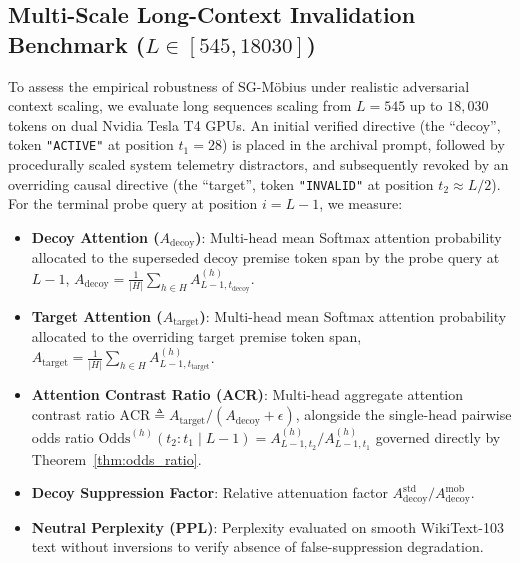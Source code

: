 \documentclass[11pt,a4paper]{article}
\theoremstyle{definition}
\begin{document}
\subsection{Multi-Scale Long-Context Invalidation Benchmark ($L \in [545, 18030]$)}
To assess the empirical robustness of SG-M\"obius under realistic adversarial context scaling, we evaluate long sequences scaling from $L = 545$ up to $18,030$ tokens on dual Nvidia Tesla T4 GPUs. An initial verified directive (the ``decoy'', token \texttt{"ACTIVE"} at position $t_1 = 28$) is placed in the archival prompt, followed by procedurally scaled system telemetry distractors, and subsequently revoked by an overriding causal directive (the ``target'', token \texttt{"INVALID"} at position $t_2 \approx L/2$). For the terminal probe query at position $i = L-1$, we measure:
\begin{itemize}
    \item \textbf{Decoy Attention ($A_{\mathrm{decoy}}$)}: Multi-head mean Softmax attention probability allocated to the superseded decoy premise token span by the probe query at $L-1$, $A_{\mathrm{decoy}} = \frac{1}{|H|} \sum_{h \in H} A^{(h)}_{L-1, t_{\mathrm{decoy}}}$.
    \item \textbf{Target Attention ($A_{\mathrm{target}}$)}: Multi-head mean Softmax attention probability allocated to the overriding target premise token span, $A_{\mathrm{target}} = \frac{1}{|H|} \sum_{h \in H} A^{(h)}_{L-1, t_{\mathrm{target}}}$.
    \item \textbf{Attention Contrast Ratio (ACR)}: Multi-head aggregate attention contrast ratio $\mathrm{ACR} \triangleq A_{\mathrm{target}} / (A_{\mathrm{decoy}} + \epsilon)$, alongside the single-head pairwise odds ratio $\mathrm{Odds}^{(h)}(t_2 : t_1 \mid L-1) = A^{(h)}_{L-1, t_2} / A^{(h)}_{L-1, t_1}$ governed directly by Theorem~\ref{thm:odds_ratio}.
    \item \textbf{Decoy Suppression Factor}: Relative attenuation factor $A_{\mathrm{decoy}}^{\mathrm{std}} / A_{\mathrm{decoy}}^{\mathrm{mob}}$.
    \item \textbf{Neutral Perplexity (PPL)}: Perplexity evaluated on smooth WikiText-103 text without inversions to verify absence of false-suppression degradation.
\end{itemize}
\end{document}
